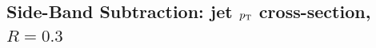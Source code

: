 

%
%
%
%
%


\subsection{Side-Band Subtraction: jet $p_{\text T}$ cross-section, $R=0.3$}
\label{sub_Bin_d_pT}

